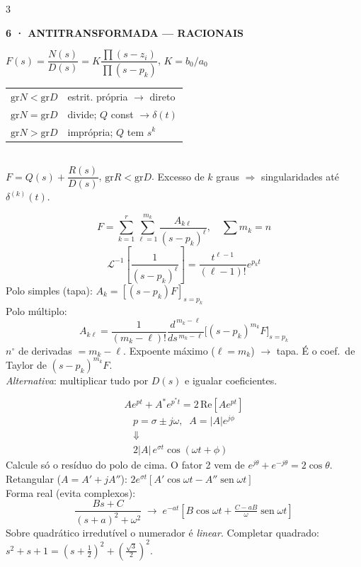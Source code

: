 \documentclass[10pt,a4paper]{article}
\newcommand{\sect}[1]{\vspace{1.2mm}{\color{acc}\rule{\linewidth}{0.9pt}}\vspace{-0.3mm}\par
  {\footnotesize\bfseries\color{acc}\MakeUppercase{#1}}\par\vspace{0.6mm}}
\newcommand{\sub}[1]{\vspace{0.8mm}{\bfseries #1}\par\vspace{0.3mm}}
\newcommand{\note}[1]{{\color{gry}#1}\par\vspace{0.4mm}}
\begin{document}
\begin{multicols}{3}
\sect{6 · Antitransformada — racionais}
$F(s)=\dfrac{N(s)}{D(s)}=K\dfrac{\prod(s-z_i)}{\prod(s-p_k)}$,\; $K=b_0/a_0$\\[0.8mm]
\sub{Passo 1: é própria?}
\begin{tabular}{@{}l@{\;}l@{}}
$\mathrm{gr}N<\mathrm{gr}D$ & estrit. própria $\to$ direto\\
$\mathrm{gr}N=\mathrm{gr}D$ & divide; $Q$ const $\to\delta(t)$\\
$\mathrm{gr}N>\mathrm{gr}D$ & imprópria; $Q$ tem $s^k$\\
\end{tabular}\\[0.6mm]
$F=Q(s)+\dfrac{R(s)}{D(s)}$, $\mathrm{gr}R<\mathrm{gr}D$.
\note{Excesso de $k$ graus $\Rightarrow$ singularidades até $\delta^{(k)}(t)$.}

\sub{Expansão e resíduos}
\[F=\sum_{k=1}^{r}\sum_{\ell=1}^{m_k}\frac{A_{k\ell}}{(s-p_k)^{\ell}},\quad \textstyle\sum m_k=n\]
\[\mathcal{L}^{-1}\!\left[\frac{1}{(s-p_k)^{\ell}}\right]=\frac{t^{\ell-1}}{(\ell-1)!}e^{p_kt}\]
Polo simples (tapa): $A_k=[(s-p_k)F]_{s=p_k}$\\[0.6mm]
Polo múltiplo:
\[A_{k\ell}=\frac{1}{(m_k{-}\ell)!}\frac{d^{\,m_k-\ell}}{ds^{\,m_k-\ell}}\Big[(s-p_k)^{m_k}F\Big]_{s=p_k}\]
{\color{gry}$n^\circ$ de derivadas $=m_k-\ell$. Expoente máximo ($\ell{=}m_k$) $\to$ tapa. É o coef.\ de Taylor de $(s-p_k)^{m_k}F$.}\\[0.6mm]
\emph{Alternativa}: multiplicar tudo por $D(s)$ e igualar coeficientes.

\sub{Par conjugado — a regra de ouro}
\[A e^{pt}+A^{*}e^{p^{*}t}=2\,\mathrm{Re}[Ae^{pt}]\]
\[\boxed{\;\begin{array}{c}p=\sigma\pm j\omega,\;\;A=|A|e^{j\phi}\\[0.4mm]\Downarrow\\[0.4mm]2|A|\,e^{\sigma t}\cos(\omega t+\phi)\end{array}\;}\]
{\color{gry}Calcule só o resíduo do polo de cima. O fator 2 vem de $e^{j\theta}{+}e^{-j\theta}{=}2\cos\theta$.}
Retangular ($A=A'+jA''$): $2e^{\sigma t}[A'\cos\omega t-A''\operatorname{sen}\omega t]$\\[0.4mm]
Forma real (evita complexos):
\[\frac{Bs+C}{(s{+}a)^2{+}\omega^2}\;\to\;e^{-at}\!\left[B\cos\omega t+\tfrac{C-aB}{\omega}\operatorname{sen}\omega t\right]\]
\note{Sobre quadrático irredutível o numerador é \emph{linear}. Completar quadrado: $s^2{+}s{+}1=(s{+}\frac12)^2+(\frac{\sqrt3}{2})^2$.}


\end{multicols}
\end{document}
